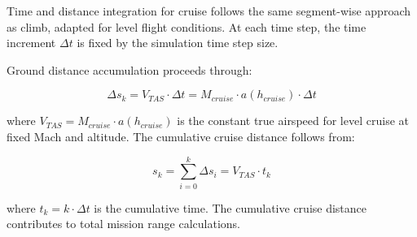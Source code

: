 Time and distance integration for cruise follows the same segment-wise approach as climb, adapted for level flight conditions. At each time step, the time increment $\Delta t$ is fixed by the simulation time step size.

Ground distance accumulation proceeds through:

\begin{equation}
\Delta s_k = V_{TAS} \cdot \Delta t = M_{cruise} \cdot a(h_{cruise}) \cdot \Delta t
\end{equation}

where $V_{TAS} = M_{cruise} \cdot a(h_{cruise})$ is the constant true airspeed for level cruise at fixed Mach and altitude. The cumulative cruise distance follows from:

\begin{equation}
s_k = \sum_{i=0}^{k} \Delta s_i = V_{TAS} \cdot t_k
\end{equation}

where $t_k = k \cdot \Delta t$ is the cumulative time. The cumulative cruise distance contributes to total mission range calculations.
